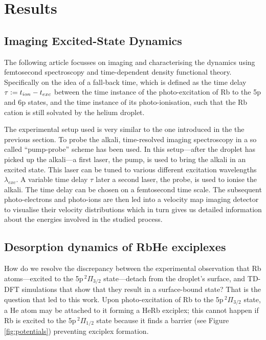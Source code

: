 \chapter{Results}
	\section{Imaging Excited-State Dynamics}
		The following article focusses on imaging and characterising the dynamics using femtosecond spectroscopy and time-dependent density functional theory. Specifically on the idea of a fall-back time, which is defined as the time delay $\tau\vcentcolon=t_{ion}-t_{exc}$ between the time instance of the photo-excitation of Rb to the 5p and 6p states, and the time instance of its photo-ionisation, such that the Rb cation is still solvated by the helium droplet.
		
		The experimental setup used is very similar to the one introduced in the the previous section. To probe the alkali, time-resolved imaging spectroscopy in a so called ``pump-probe'' scheme has been used. In this setup---after the droplet has picked up the alkali---a first laser, the pump, is used to bring the alkali in an excited state. This laser can be tuned to various different excitation wavelengths $\lambda_{exc}$. A variable time delay $\tau$ later a second laser, the probe, is used to ionise the alkali. The time delay can be chosen on a femtosecond time scale. The subsequent photo-electrons and photo-ions are then led into a velocity map imaging detector\citep{Eppink1997} to visualise their velocity distributions which in turn gives us detailed information about the energies involved in the studied process.
		
		
		\cleardoublepage

	\section{Desorption dynamics of RbHe exciplexes}
		How do we resolve the discrepancy between the experimental observation that Rb atoms---excited to the 5p$\,^2\Pi_{3/2}$ state---detach from the droplet's surface, and TD-DFT simulations that show that they result in a surface-bound state? That is the question that led to this work. Upon photo-excitation of Rb to the 5p$\,^2\Pi_{3/2}$ state, a He atom may be attached to it forming a HeRb exciplex; this cannot happen if Rb is excited to the 5p$\,^2\Pi_{1/2}$ state because it finds a barrier (see Figure \ref{fig:potentials}) preventing exciplex formation.

